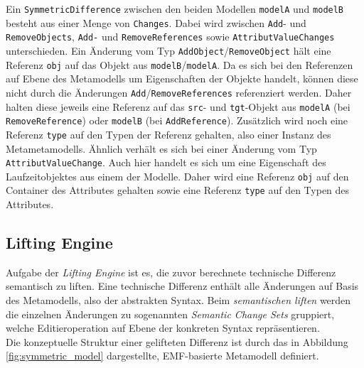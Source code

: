 Ein \texttt{SymmetricDifference} zwischen den beiden Modellen \texttt{modelA} und \texttt{modelB} besteht aus einer Menge von \texttt{Changes}. Dabei wird zwischen \texttt{Add}- und \texttt{Remove\-Objects}, \texttt{Add-} und \texttt{Remove\-References} sowie \texttt{Attribut\-Value\-Changes} unterschieden. Ein Änderung vom Typ \texttt{Add\-Object}/\texttt{Remove\-Object} hält eine Referenz \texttt{obj} auf das Objekt aus \texttt{modelB}/\texttt{modelA}. Da es sich bei den Referenzen auf Ebene des Metamodells um Eigenschaften der Objekte handelt, können diese nicht durch die Änderungen \texttt{Add}/\texttt{Remove\-References} referenziert werden. Daher halten diese jeweils eine Referenz auf das \texttt{src}- und \texttt{tgt}-Objekt aus \texttt{modelA} (bei \texttt{Remove\-Reference}) oder \texttt{modelB} (bei \texttt{Add\-Reference}). Zusätzlich wird noch eine Referenz \texttt{type} auf den Typen der Referenz gehalten, also einer Instanz des Metametamodells. Ähnlich verhält es sich bei einer Änderung vom Typ \texttt{AttributValueChange}. Auch hier handelt es sich um eine Eigenschaft des Laufzeitobjektes aus einem der Modelle. Daher wird eine Referenz \texttt{obj} auf den Container des Attributes gehalten sowie eine Referenz \texttt{type} auf den Typen des Attributes.

\newpage


\subsection{Lifting Engine}

Aufgabe der \textit{Lifting Engine} ist es, die zuvor berechnete technische Differenz semantisch zu liften.
Eine technische Differenz enthält alle Än\-der\-ung\-en  auf Basis des Metamodells, also der abstrakten Syntax.
Beim \textit{semantischen liften} werden die einzelnen Änderungen zu sogenannten \textit{Semantic Change Sets} gruppiert, welche Editieroperation auf Ebene der konkreten Syntax repräsentieren.\\
Die konzeptuelle Struktur einer gelifteten Differenz ist durch das in Abbildung \ref{fig:symmetric_model} dargestellte, EMF-basierte Metamodell definiert. 

